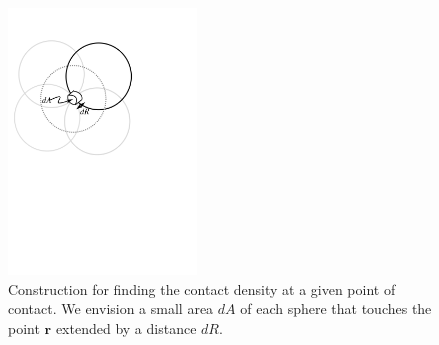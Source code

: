 \documentclass[letterpaper,twocolumn,amsmath,amssymb,prb]{revtex4-1}
\begin{document}
\begin{figure}
\includegraphics[width=5cm]{figs/contact}
\caption{Construction for finding the contact density at a given point
  of contact.  We envision a small area $dA$ of each sphere that touches
the point $\mathbf{r}$ extended by a distance $dR$.}
\label{fig:contact}
\end{figure}
\end{document}
